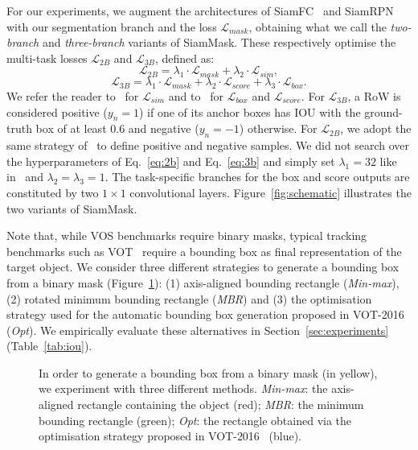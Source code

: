 For our experiments, we augment the architectures of SiamFC~\cite{bertinetto2016fully} and SiamRPN~\cite{SiamRPN} with our segmentation branch and the loss $\mathcal{L}_{mask}$, obtaining what we call the \emph{two-branch} and \emph{three-branch} variants of SiamMask.
These respectively optimise the multi-task losses $\mathcal{L}_{2B}$ and $\mathcal{L}_{3B}$, defined as:
\begin{equation}
\label{eq:2b}
\mathcal{L}_{2B} = \lambda_{1} \cdot \mathcal{L}_{mask} + \lambda_{2} \cdot \mathcal{L}_{sim},
\end{equation}
\begin{equation}
\label{eq:3b}
\mathcal{L}_{3B} = \lambda_{1} \cdot \mathcal{L}_{mask} + \lambda_{2} \cdot \mathcal{L}_{score}+ \lambda_{3} \cdot \mathcal{L}_{box}.
\end{equation}
We refer the reader to~\cite[Section 2.2]{bertinetto2016fully} for $\mathcal{L}_{sim}$ and to~\cite[Section 3.2]{SiamRPN} for $\mathcal{L}_{box}$ and $\mathcal{L}_{score}$. 
For $\mathcal{L}_{3B}$, a RoW is considered positive ($y_{n} = 1$) if one of its anchor boxes has IOU with the ground-truth box of at least 0.6 and negative ($y_{n} = -1$) otherwise.
For $\mathcal{L}_{2B}$, we adopt the same strategy of~\cite{bertinetto2016fully} to define positive and negative samples.
We did not search over the hyperparameters of Eq.~\ref{eq:2b} and Eq.~\ref{eq:3b} and simply set $\lambda_1=32$ like in~\cite{DeepMask} and $\lambda_{2}=\lambda_{3}=1$.
The task-specific branches for the box and score outputs are constituted by two $1{\times}1$ convolutional layers.
Figure~\ref{fig:schematic} illustrates the two variants of SiamMask.


Note that, while VOS benchmarks require binary masks, typical tracking benchmarks such as VOT~\cite{kristan2016visual,VOT2018} require a bounding box as final representation of the target object.
We consider three different strategies to generate a bounding box from a binary mask (Figure~\ref{fig:bbox}):
(1) axis-aligned bounding rectangle (\emph{Min-max}), (2) rotated minimum bounding rectangle (\emph{MBR}) and (3) the optimisation strategy used for the automatic bounding box generation proposed in VOT-2016~\cite{kristan2016visual} (\emph{Opt}).
We empirically evaluate these alternatives in Section~\ref{sec:experiments} (Table~\ref{tab:iou}).

\begin{figure}[t]
\centering

\caption{
In order to generate a bounding box from a binary mask (in yellow), we experiment with three different methods.
\textit{Min-max}: the axis-aligned rectangle containing the object (red); \textit{MBR}: the minimum bounding rectangle (green); \textit{Opt}: the rectangle obtained via the optimisation strategy proposed in VOT-2016~\cite{kristan2016visual} (blue).}
\vspace{-1em}
\label{fig:bbox}
\end{figure}


